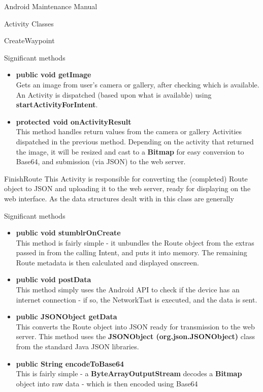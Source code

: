 \documentclass{article}
\begin{document}
\begin{section}{Android Maintenance Manual}
\begin{subsection}{Activity Classes}
\begin{subsubsection}{CreateWaypoint}
\begin{paragraph}{Significant methods}
\begin{itemize}
					\item{{\bf public void getImage} \\
					Gets an image from user's camera or gallery, after checking which is available. An Activity is dispatched (based upon what is available) using {\bf startActivityForIntent}.}
					
					\item{{\bf protected void onActivityResult} \\
					This method handles return values from the camera or gallery Activities dispatched in the previous method. Depending on the activity that returned the image, it will be resized and cast to a {\bf Bitmap} for easy conversion to Base64, and submission (via JSON) to the web server.}
				\end{itemize}
			\end{paragraph}
		\end{subsubsection}
		
		\newpage
		\begin{subsubsection}{FinishRoute}
		This Activity is responsible for converting the (completed) Route object to JSON and uploading it to the web server, ready for displaying on the web interface. As the data structures dealt with in this class are generally 
			\begin{paragraph}{Significant methods}
				\begin{itemize}
					\item{{\bf public void stumblrOnCreate} \\
					This method is fairly simple - it unbundles the Route object from the extras passed in from the calling Intent, and puts it into memory. The remaining Route metadata is then calculated and displayed onscreen.}
					\item{{\bf public void postData} \\
					This method simply uses the Android API to check if the device has an internet connection - if so, the NetworkTast is executed, and the data is sent.}
					
					\item{{\bf public JSONObject getData} \\
					This converts the Route object into JSON ready for transmission to the web server. This method uses the {\bf JSONObject (org.json.JSONObject)} class from the standard Java JSON libraries.}
					
					\item{{\bf public String encodeToBase64} \\
					This is fairly simple - a {\bf ByteArrayOutputStream} decodes a {\bf Bitmap} object into raw data - which is then encoded using Base64}
				\end{itemize}
			\end{paragraph}
		\end{subsubsection}
		

\end{subsection}
\end{section}
\end{document}

